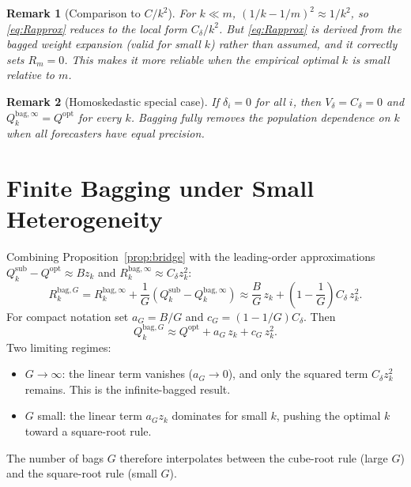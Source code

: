 \documentclass[12pt,a4paper]{article}
\newtheorem{remark}{Remark}
\theoremstyle{definition}
\begin{document}
\begin{remark}[Comparison to $C/k^2$]
For $k\ll m$, $(1/k-1/m)^2\approx 1/k^2$, so \eqref{eq:Rapprox} reduces
to the local form $C_\delta/k^2$. But \eqref{eq:Rapprox} is derived from the
bagged weight expansion (valid for small $k$) rather than assumed, and
it correctly sets $R_m=0$. This makes it more reliable when the empirical
optimal $k$ is small relative to $m$.
\end{remark}

\begin{remark}[Homoskedastic special case]
If $\delta_i=0$ for all $i$, then $V_\delta=C_\delta=0$ and
$Q_k^{\mathrm{bag},\infty}=Q^{\mathrm{opt}}$ for every $k$. Bagging
fully removes the population dependence on $k$ when all forecasters have
equal precision.
\end{remark}

\section{Finite Bagging under Small Heterogeneity}
\label{sec:finiteG}

Combining Proposition~\ref{prop:bridge} with the leading-order
approximations $Q_k^{\mathrm{sub}}-Q^{\mathrm{opt}}\approx Bz_k$ and
$R_k^{\mathrm{bag},\infty}\approx C_\delta z_k^2$:
\begin{equation}\label{eq:Rbag_G}
R_k^{\mathrm{bag},G} = R_k^{\mathrm{bag},\infty} + \frac{1}{G}(Q_k^{\mathrm{sub}}-Q_k^{\mathrm{bag},\infty})
\approx \frac{B}{G}\,z_k + \left(1-\frac{1}{G}\right)C_\delta\,z_k^2.
\end{equation}
For compact notation set $a_G=B/G$ and $c_G=(1-1/G)C_\delta$. Then
\begin{equation}
Q_k^{\mathrm{bag},G} \approx Q^{\mathrm{opt}} + a_G\,z_k + c_G\,z_k^2.
\end{equation}
Two limiting regimes:
\begin{itemize}[nosep]
\item $G\to\infty$: the linear term vanishes ($a_G\to 0$), and only the
  squared term $C_\delta z_k^2$ remains. This is the infinite-bagged result.
\item $G$ small: the linear term $a_G z_k$ dominates for small $k$,
  pushing the optimal $k$ toward a square-root rule.
\end{itemize}
The number of bags $G$ therefore interpolates between the cube-root rule
(large $G$) and the square-root rule (small $G$).
\end{document}
